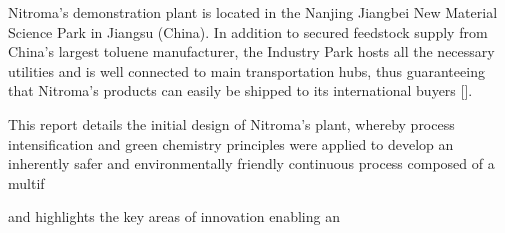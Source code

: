 Nitroma's demonstration plant is located in the Nanjing Jiangbei New Material Science Park in Jiangsu (China). In addition to secured feedstock supply from China’s largest toluene manufacturer, the Industry Park hosts all the necessary utilities and is well connected to main transportation hubs, thus guaranteeing that Nitroma's products can easily be shipped to its international buyers []. 


This report details the initial design of Nitroma's plant, whereby process intensification and green chemistry principles were applied to develop an inherently safer and environmentally friendly continuous process composed of a multif


and highlights the key areas of innovation enabling an 






